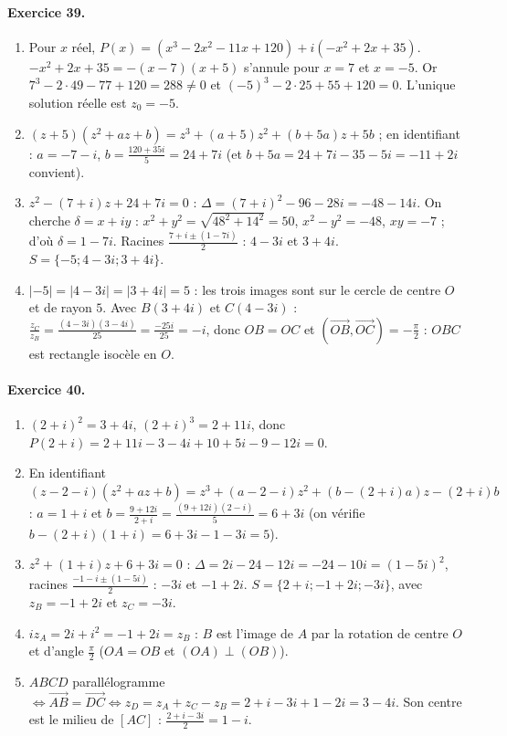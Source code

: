 \begin{corrige}
\paragraph{Exercice 39.}
\begin{enumerate}
\item Pour $x$ r\'eel, $P(x) = (x^3 - 2x^2 - 11x + 120) + i(-x^2 + 2x + 35)$.
      $-x^2 + 2x + 35 = -(x - 7)(x + 5)$ s'annule pour $x = 7$ et $x = -5$.
      Or $7^3 - 2\cdot 49 - 77 + 120 = 288 \neq 0$ et $(-5)^3 - 2\cdot 25 + 55 + 120 = 0$.
      L'unique solution r\'eelle est $\boxed{z_0 = -5}$.
\item $(z + 5)(z^2 + az + b) = z^3 + (a + 5)z^2 + (b + 5a)z + 5b$ ; en identifiant : $a = -7 - i$, $b = \frac{120 + 35i}{5} = 24 + 7i$
      (et $b + 5a = 24 + 7i - 35 - 5i = -11 + 2i$ convient).
\item $z^2 - (7 + i)z + 24 + 7i = 0$ : $\Delta = (7 + i)^2 - 96 - 28i = -48 - 14i$. On cherche $\delta = x + iy$ :
      $x^2 + y^2 = \sqrt{48^2 + 14^2} = 50$, $x^2 - y^2 = -48$, $xy = -7$ ; d'o\`u $\delta = 1 - 7i$.
      Racines $\frac{7 + i \pm (1 - 7i)}{2}$ : $4 - 3i$ et $3 + 4i$. $S = \{-5 ; 4 - 3i ; 3 + 4i\}$.
\item $|-5| = |4 - 3i| = |3 + 4i| = 5$ : les trois images sont sur le cercle de centre $O$ et de rayon $5$.
      Avec $B(3 + 4i)$ et $C(4 - 3i)$ : $\frac{z_C}{z_B} = \frac{(4 - 3i)(3 - 4i)}{25} = \frac{-25i}{25} = -i$,
      donc $OB = OC$ et $\left(\overrightarrow{OB},\overrightarrow{OC}\right) = -\frac{\pi}{2}$ : $OBC$ est rectangle isoc\`ele en $O$.
\end{enumerate}

\paragraph{Exercice 40.}
\begin{enumerate}
\item $(2+i)^2 = 3 + 4i$, $(2+i)^3 = 2 + 11i$, donc $P(2+i) = 2 + 11i - 3 - 4i + 10 + 5i - 9 - 12i = 0$.
\item En identifiant $(z - 2 - i)(z^2 + az + b) = z^3 + (a - 2 - i)z^2 + (b - (2+i)a)z - (2+i)b$ :
      $a = 1 + i$ et $b = \frac{9 + 12i}{2 + i} = \frac{(9 + 12i)(2 - i)}{5} = 6 + 3i$ (on v\'erifie $b - (2+i)(1+i) = 6 + 3i - 1 - 3i = 5$).
\item $z^2 + (1+i)z + 6 + 3i = 0$ : $\Delta = 2i - 24 - 12i = -24 - 10i = (1 - 5i)^2$, racines $\frac{-1 - i \pm (1 - 5i)}{2}$ : $-3i$ et $-1 + 2i$.
      $S = \{2 + i ; -1 + 2i ; -3i\}$, avec $z_B = -1 + 2i$ et $z_C = -3i$.
\item $i z_A = 2i + i^2 = -1 + 2i = z_B$ : $B$ est l'image de $A$ par la rotation de centre $O$ et d'angle $\frac{\pi}{2}$ ($OA = OB$ et $(OA) \perp (OB)$).
\item $ABCD$ parall\'elogramme $\iff \overrightarrow{AB} = \overrightarrow{DC} \iff z_D = z_A + z_C - z_B = 2 + i - 3i + 1 - 2i = \boxed{3 - 4i}$.
      Son centre est le milieu de $[AC]$ : $\frac{2 + i - 3i}{2} = \boxed{1 - i}$.
\end{enumerate}


\end{corrige}
